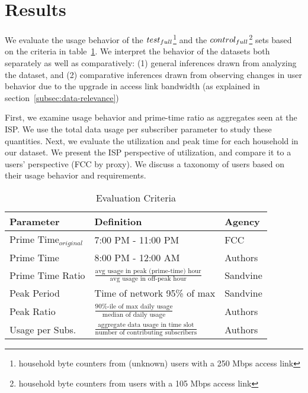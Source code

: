 \section{Results}
\label{sec:results}

We evaluate the usage behavior of the $test_{full}$\footnote{household byte counters
from (unknown) users with a 250 Mbps access link}  and the $control_{full}$\footnote{household
byte counters from users with a 105 Mbps access link} sets based
on the criteria in table~\ref{tab:eval-criteria}. We interpret the behavior of the datasets
both separately as well as comparatively: (1) general inferences drawn from analyzing the dataset,
and (2) comparative inferences drawn from observing changes in user behavior due to the upgrade
in access link bandwidth (as explained in section~\ref{subsec:data-relevance})

First, we examine usage behavior and prime-time ratio as aggregates seen at the ISP. We use 
the total data usage per subscriber parameter to study these quantities. Next, we
evaluate the utilization and peak time for each household in our dataset. We present the ISP
perspective of utilization, and compare it to a users' perspective (FCC by proxy). We discuss
a taxonomy of users based on their usage behavior and requirements. %


\begin{table}[ht!]
\small 
\begin{tabular}{|l|l|l|}
\hline
\textbf{Parameter}				& \textbf{Definition}				& \textbf{Agency}  \\ \hline
Prime Time$_{original}$			& 7:00 PM - 11:00 PM				& FCC       \\
Prime Time       				& 8:00 PM - 12:00 AM                & Authors       \\
Prime Time Ratio 				& \( \frac{ \text{avg usage in peak (prime-time) hour}}{ \text{avg usage in off-peak hour}}\) 												& Sandvine  \\
Peak Period						& Time of network 95\% of max      	& Sandvine \\
Peak Ratio       				& \(\frac{\text{90\%-ile of max daily usage}}{\text{median of daily usage}}\)                											& Authors \\
Usage per Subs.       			& \(\frac{\text{aggregate data usage in time slot}}{\text{number of contributing subscribers}}\)                											& Authors \\ \hline
\end{tabular}
\caption{Evaluation Criteria}
\label{tab:eval-criteria}
\end{table}





%